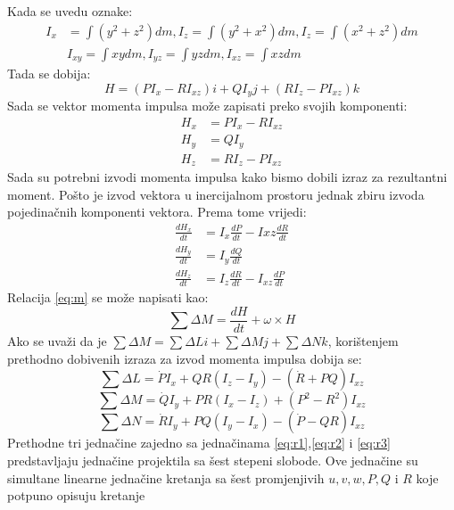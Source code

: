     Kada se uvedu oznake:
    \begin{equation}
        \begin{split}           
        I_x&=\int (y^2+z^2)dm, I_z=\int (y^2+x^2)dm,I_z=\int (x^2+z^2)dm\\
        &I_{xy}=\int xydm, I_{yz}=\int yzdm,I_{xz}=\int xzdm 
    \end{split}
    \end{equation}
Tada se dobija:
\begin{equation}
    H=(PI_x-RI_{xz})i+QI_yj+(RI_z-PI_{xz})k
\end{equation}
Sada se vektor momenta impulsa može zapisati preko svojih komponenti:
\begin{align}
    H_x&=PI_x-RI_{xz}\\
    H_y&=QI_y\\
    H_z&=RI_z-PI_{xz}
\end{align}
Sada su potrebni izvodi momenta impulsa kako bismo dobili izraz za rezultantni moment.
Pošto je izvod vektora u inercijalnom prostoru jednak zbiru izvoda pojedinačnih komponenti vektora. Prema tome 
vrijedi:
\begin{align}
    \frac{dH_x}{dt}&=I_x\frac{dP}{dt}-I{xz}\frac{dR}{dt}\\
    \frac{dH_y}{dt}&=I_y\frac{dQ}{dt}\\
    \frac{dH_z}{dt}&=I_z\frac{dR}{dt}-I_{xz}\frac{dP}{dt}
\end{align}
Relacija \ref{eq:m} se može napisati kao:
\begin{equation}
    \sum \Delta M=\frac{dH}{dt}+\omega \times H
\end{equation}
Ako se uvaži da je $\sum \Delta M=\sum \Delta Li + \sum \Delta Mj+\sum \Delta Nk$, korištenjem prethodno dobivenih 
izraza za izvod momenta impulsa dobija se:
\begin{equation}
    \sum \Delta L=\dot{P}I_x+QR(I_z-I_y)-(\dot{R}+PQ)I_{xz}
\end{equation}
\begin{equation}
    \sum \Delta M=\dot{Q}I_y+PR(I_x-I_z)+(P^2-R^2)I_{xz}
\end{equation}
\begin{equation}
    \sum \Delta N=\dot{R}I_y+PQ(I_y-I_x)-(\dot{P}-QR)I_{xz}
\end{equation}
Prethodne tri jednačine zajedno sa jednačinama \ref{eq:r1},\ref{eq:r2} i \ref{eq:r3} predstavljaju
jednačine projektila sa šest stepeni slobode. Ove jednačine su simultane linearne jednačine 
kretanja sa šest promjenjivih $u,v,w,P,Q$ i $R$ koje potpuno opisuju kretanje 
